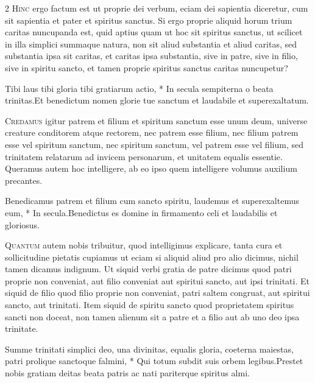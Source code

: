 \begin{multicols*}{2}
\lettrine[lines=2]{\zallmancaps \color{Red} H}{inc} ergo factum est ut proprie dei verbum, eciam dei sapientia diceretur, cum sit sapientia et pater et spiritus sanctus. Si ergo proprie aliquid horum trium caritas nuncupanda est, quid aptius quam ut hoc sit spiritus sanctus, ut scilicet in illa simplici summaque natura, non sit aliud substantia et aliud caritas, sed substantia ipsa sit caritas, et caritas ipsa substantia, sive in patre, sive in filio, sive in spiritu sancto, et tamen proprie spiritus sanctus caritas nuncupetur?
\begin{responsory}
{Tibi laus tibi gloria tibi gratiarum actio, * In secula sempiterna o beata trinitas.}{Et benedictum nomen glorie tue sanctum et laudabile et superexaltatum.}
\end{responsory}%
\lettrine[lines=2]{\zallmancaps \color{Blue} C}{redamus} igitur patrem et filium et spiritum sanctum esse unum deum, universe creature conditorem atque rectorem, nec patrem esse filium, nec filium patrem esse vel spiritum sanctum, nec spiritum sanctum, vel patrem esse vel filium, sed trinitatem relatarum ad invicem personarum, et unitatem equalis essentie. Queramus autem hoc intelligere, ab eo ipso quem intelligere volumus auxilium precantes.
\begin{responsory}
{Benedicamus patrem et filium cum sancto spiritu, laudemus et superexaltemus eum, * In secula.}{Benedictus es domine in firmamento celi et laudabilis et gloriosus.}
\end{responsory}%
\lettrine[lines=2]{\zallmancaps \color{Red} Q}{uantum} autem nobis tribuitur, quod intelligimus explicare, tanta cura et sollicitudine pietatis cupiamus ut eciam si aliquid aliud pro alio dicimus, nichil tamen dicamus indignum. Ut siquid verbi gratia de patre dicimus quod patri proprie non conveniat, aut filio conveniat aut spiritui sancto, aut ipsi trinitati. Et siquid de filio quod filio proprie non conveniat, patri saltem congruat, aut spiritui sancto, aut trinitati. Item siquid de spiritu sancto quod proprietatem spiritus sancti non doceat, non tamen alienum sit a patre et a filio aut ab uno deo ipsa trinitate.
\begin{responsory-doxology}
{Summe trinitati simplici deo, una divinitas, equalis gloria, coeterna maiestas, patri prolique sanctoque falmini, * Qui totum subdit suis orbem legibus.}{Prestet nobis gratiam deitas beata patris ac nati pariterque spiritus almi.}

\end{responsory-doxology}
\end{multicols*}
